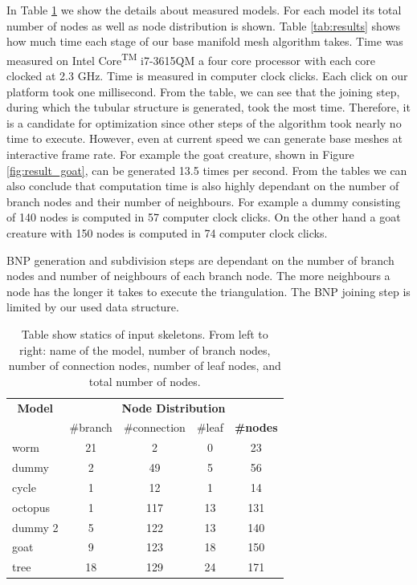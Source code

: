 In Table \ref{tab:models} we show the details about measured models.
For each model its total number of nodes as well as node distribution is shown.
Table \ref{tab:results} shows how much time each stage of our base manifold mesh algorithm takes.
Time was measured on Intel\textsuperscript{\textregistered}  Core\textsuperscript{TM} i7-3615QM a four core processor with each core clocked at 2.3 GHz.
Time is measured in computer clock clicks.
Each click on our platform took one millisecond.
From the table, we can see that the joining step, during which the tubular structure is generated, took the most time.
Therefore, it is a candidate for optimization since other steps of the algorithm took nearly no time to execute.
However, even at current speed we can generate base meshes at interactive frame rate.
For example the goat creature, shown in Figure \ref{fig:result_goat}, can be generated 13.5 times per second.
From the tables we can also conclude that computation time is also highly dependant on the number of branch nodes and their number of neighbours.
For example a dummy consisting of 140 nodes is computed in 57 computer clock clicks.
On the other hand a goat creature with 150 nodes is computed in 74 computer clock clicks.

BNP generation and subdivision steps are dependant on the number of branch nodes and number of neighbours of each branch node.
The more neighbours a node has the longer it takes to execute the triangulation.
The BNP joining step is limited by our used data structure.


\begin{table}[h]
\centering
\begin{tabular}{l|ccc||c}\hline
\multicolumn{1}{c}{\textbf{Model}} & \multicolumn{4}{c}{\textbf{Node Distribution}} \\
   & \#branch & \#connection & \#leaf & \textbf{\#nodes} \\ \hline
  worm & 21 & 2 & 0 & 23 \\
  dummy & 2 & 49 & 5 & 56 \\
  cycle & 1 & 12 & 1 & 14 \\
  octopus & 1 & 117 & 13 & 131 \\
  dummy 2 & 5 & 122 & 13 & 140 \\
  goat & 9 & 123 & 18 & 150 \\
  tree & 18 & 129 & 24 & 171 \\ \hline
\end{tabular}
\caption[Table show statics of input skeletons]{Table show statics of input skeletons. From left to right: name of the model, number of branch nodes, number of connection nodes, number of leaf nodes, and total number of nodes.}
\label{tab:models}
\end{table}

